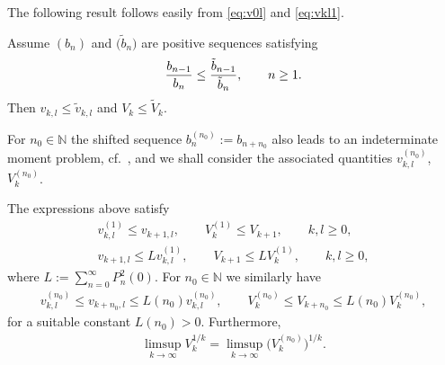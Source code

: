 The following result follows easily from \eqref{eq:v0l} and \eqref{eq:vkl1}.

\begin{prop}\label{thm:compV} Assume $(b_n)$ and $\big(\tilde{b}_n\big)$ are positive sequences satisfying
\begin{gather*}
{b_{n-1}\over b_{n}} \le {\tilde{b}_{n-1}\over \tilde{b}_{n}} ,\qquad n\ge 1.
\end{gather*}
 Then $v_{k,l} \le \tilde{v}_{k,l} $ and $V_k \le \tilde{V}_k$.
\end{prop}

For $n_0\in\mathbb N$ the shifted sequence $b_n^{(n_0)}:=b_{n+n_0}$ also leads to an indeterminate moment problem, cf.~\cite[p.~28]{Ak}, and we shall consider the associated quantities $v_{k,l}^{(n_0)}$, $V_k^{(n_0)}$.

\begin{prop}\label{thm:shiftV1} The expressions above satisfy
\begin{gather}\label{eq:shiftV1}
v_{k,l}^{(1)}\le v_{k+1,l},\qquad V_k^{(1)}\le V_{k+1},\qquad k,l\ge 0,\\
\label{eq:shiftV2}
v_{k+1,l}\le L v_{k,l}^{(1)},\qquad V_{k+1}\le L V_k^{(1)},\qquad k,l\ge 0,
\end{gather}
where $L:=\sum\limits_{n=0}^\infty P_n^2(0)$. For $n_0\in\mathbb N$ we similarly have
\begin{gather}\label{eq:shiftV1a}
v_{k,l}^{(n_0)}\le v_{k+n_0,l}\le L(n_0) v_{k,l}^{(n_0)},\qquad V_k^{(n_0)}\le V_{k+n_0}\le L(n_0) V_k^{(n_0)},
\end{gather}
for a suitable constant $L(n_0)>0$. Furthermore,
\begin{gather} \label{eq:shiftV3}
\limsup_{k\to\infty} V_k^{1/k}=\limsup_{k\to\infty} \big(V_k^{(n_0)}\big)^{1/k}.
\end{gather}
\end{prop}


